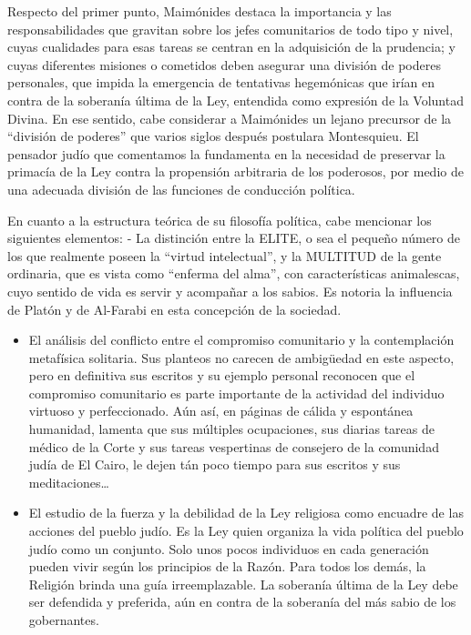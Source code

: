 \documentclass[
]{book}
\begin{document}
Respecto del primer punto, Maimónides destaca la importancia y las responsabilidades que gravitan sobre los jefes comunitarios de todo tipo y nivel, cuyas cualidades para esas tareas se centran en la adquisición de la prudencia; y cuyas diferentes misiones o cometidos deben asegurar una división de poderes personales, que impida la emergencia de tentativas hegemónicas que irían en contra de la soberanía última de la Ley, entendida como expresión de la Voluntad Divina. En ese sentido, cabe considerar a Maimónides un lejano precursor de la ``división de poderes'' que varios siglos después postulara Montesquieu. El pensador judío que comentamos la fundamenta en la necesidad de preservar la primacía de la Ley contra la propensión arbitraria de los poderosos, por medio de una adecuada división de las funciones de conducción política.

En cuanto a la estructura teórica de su filosofía política, cabe mencionar los siguientes elementos: - La distinción entre la ELITE, o sea el pequeño número de los que realmente poseen la ``virtud intelectual'', y la MULTITUD de la gente ordinaria, que es vista como ``enferma del alma'', con características animalescas, cuyo sentido de vida es servir y acompañar a los sabios. Es notoria la influencia de Platón y de Al-Farabi en esta concepción de la sociedad.

\begin{itemize}
\item
  El análisis del conflicto entre el compromiso comunitario y la contemplación metafísica solitaria. Sus planteos no carecen de ambigüedad en este aspecto, pero en definitiva sus escritos y su ejemplo personal reconocen que el compromiso comunitario es parte importante de la actividad del individuo virtuoso y perfeccionado. Aún así, en páginas de cálida y espontánea humanidad, lamenta que sus múltiples ocupaciones, sus diarias tareas de médico de la Corte y sus tareas vespertinas de consejero de la comunidad judía de El Cairo, le dejen tán poco tiempo para sus escritos y sus meditaciones\ldots{}
\item
  El estudio de la fuerza y la debilidad de la Ley religiosa como encuadre de las acciones del pueblo judío. Es la Ley quien organiza la vida política del pueblo judío como un conjunto. Solo unos pocos individuos en cada generación pueden vivir según los principios de la Razón. Para todos los demás, la Religión brinda una guía irreemplazable. La soberanía última de la Ley debe ser defendida y preferida, aún en contra de la soberanía del más sabio de los gobernantes.
\end{itemize}
\end{document}
